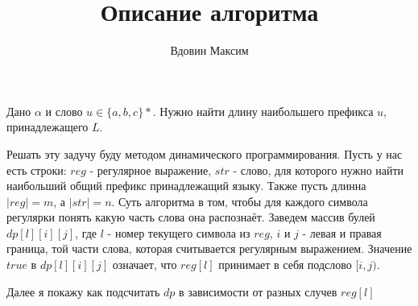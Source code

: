\documentclass[12pt,a4paper]{extreport}
\title{Описание алгоритма}
\author{Вдовин Максим}
\begin{document}
\maketitle

\par Дано $\alpha$ и слово $u \in \{a, b, c\}*$. Нужно найти длину наибольшего префикса $u$, принадлежащего $L$.

\par Решать эту задучу буду методом динамического программирования. Пусть у нас есть строки: $reg$ - регулярное выражение, $str$ - слово, для которого нужно найти наибольший общий префикс принадлежащий языку. Также пусть длинна $|reg| = m$, а $|str| = n$. Суть алгоритма в том, чтобы для каждого символа регулярки понять какую часть слова она распознаёт. Заведем массив булей $dp[l][i][j]$, где $l$ - номер текущего символа из $reg$, $i$ и $j$ - левая и правая граница, той части слова, которая считывается регулярным выражением. Значение $true$ в $dp[l][i][j]$ означает, что $reg[l]$ принимает в себя подслово $[i,j)$.
\par Далее я покажу как подсчитать $dp$ в зависимости от разных случев $reg[l]$
\end{document}

